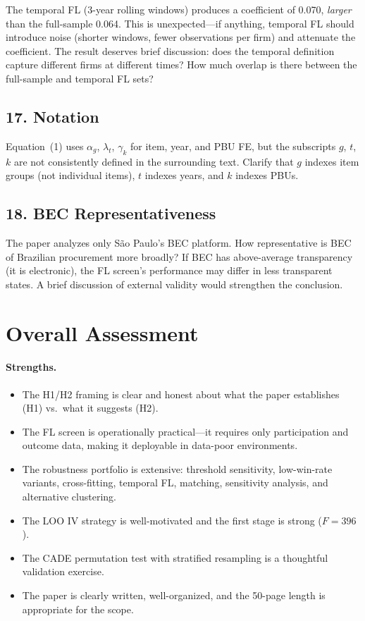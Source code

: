 \documentclass[12pt]{article}
\begin{document}
The temporal FL (3-year rolling windows) produces a coefficient of 0.070,
\emph{larger} than the full-sample 0.064. This is unexpected---if
anything, temporal FL should introduce noise (shorter windows, fewer
observations per firm) and attenuate the coefficient. The result
deserves brief discussion: does the temporal definition capture different
firms at different times? How much overlap is there between the
full-sample and temporal FL sets?

\subsection*{17. Notation}

Equation~(1) uses $\alpha_g$, $\lambda_t$, $\gamma_k$ for item, year,
and PBU FE, but the subscripts $g$, $t$, $k$ are not consistently
defined in the surrounding text. Clarify that $g$ indexes item groups
(not individual items), $t$ indexes years, and $k$ indexes PBUs.

\subsection*{18. BEC Representativeness}

The paper analyzes only S\~ao Paulo's BEC platform. How representative
is BEC of Brazilian procurement more broadly? If BEC has above-average
transparency (it is electronic), the FL screen's performance may differ
in less transparent states. A brief discussion of external validity
would strengthen the conclusion.


\section*{Overall Assessment}

\paragraph{Strengths.}
\begin{itemize}[]
  \item The H1/H2 framing is clear and honest about what the paper
    establishes (H1) vs.\ what it suggests (H2).
  \item The FL screen is operationally practical---it requires only
    participation and outcome data, making it deployable in
    data-poor environments.
  \item The robustness portfolio is extensive: threshold sensitivity,
    low-win-rate variants, cross-fitting, temporal FL, matching,
    sensitivity analysis, and alternative clustering.
  \item The LOO IV strategy is well-motivated and the first stage is
    strong ($F = 396$).
  \item The CADE permutation test with stratified resampling is a
    thoughtful validation exercise.
  \item The paper is clearly written, well-organized, and the 50-page
    length is appropriate for the scope.
\end{itemize}
\end{document}
